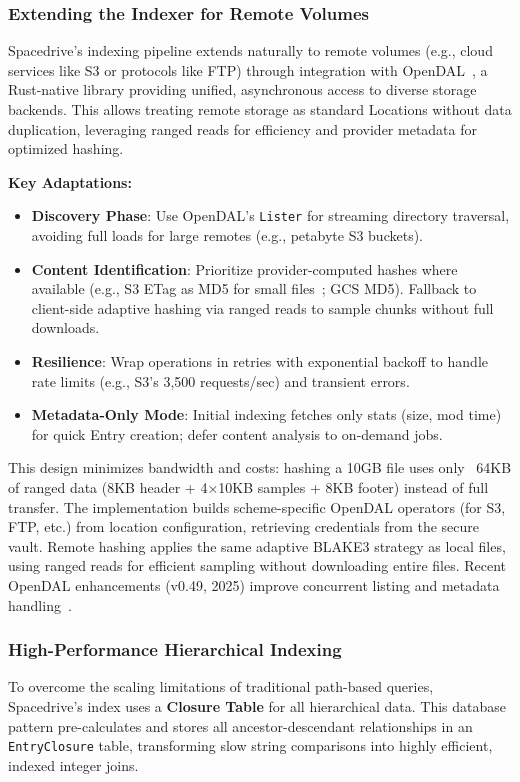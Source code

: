 \documentclass[sigconf]{acmart}
\begin{document}
\subsubsection{Extending the Indexer for Remote Volumes}
\label{sec:remote-volumes}

Spacedrive's indexing pipeline extends naturally to remote volumes (e.g., cloud services like S3 or protocols like FTP) through integration with OpenDAL~\cite{opendal-2025}, a Rust-native library providing unified, asynchronous access to diverse storage backends. This allows treating remote storage as standard Locations without data duplication, leveraging ranged reads for efficiency and provider metadata for optimized hashing.

\textbf{Key Adaptations:}
\begin{itemize}[noitemsep, topsep=0pt]
\item \textbf{Discovery Phase}: Use OpenDAL's \texttt{Lister} for streaming directory traversal, avoiding full loads for large remotes (e.g., petabyte S3 buckets).
\item \textbf{Content Identification}: Prioritize provider-computed hashes where available (e.g., S3 ETag as MD5 for small files~\cite{aws-s3-etag-2025}; GCS MD5). Fallback to client-side adaptive hashing via ranged reads to sample chunks without full downloads.
\item \textbf{Resilience}: Wrap operations in retries with exponential backoff to handle rate limits (e.g., S3's 3,500 requests/sec) and transient errors.
\item \textbf{Metadata-Only Mode}: Initial indexing fetches only stats (size, mod time) for quick Entry creation; defer content analysis to on-demand jobs.
\end{itemize}

This design minimizes bandwidth and costs: hashing a 10GB file uses only ~64KB of ranged data (8KB header + 4×10KB samples + 8KB footer) instead of full transfer. The implementation builds scheme-specific OpenDAL operators (for S3, FTP, etc.) from location configuration, retrieving credentials from the secure vault. Remote hashing applies the same adaptive BLAKE3 strategy as local files, using ranged reads for efficient sampling without downloading entire files. Recent OpenDAL enhancements (v0.49, 2025) improve concurrent listing and metadata handling~\cite{opendal-changelog-2025}.

\subsubsection{High-Performance Hierarchical Indexing}
To overcome the scaling limitations of traditional path-based queries, Spacedrive's index uses a \textbf{Closure Table} for all hierarchical data. This database pattern pre-calculates and stores all ancestor-descendant relationships in an \texttt{EntryClosure} table, transforming slow string comparisons into highly efficient, indexed integer joins.
\end{document}

